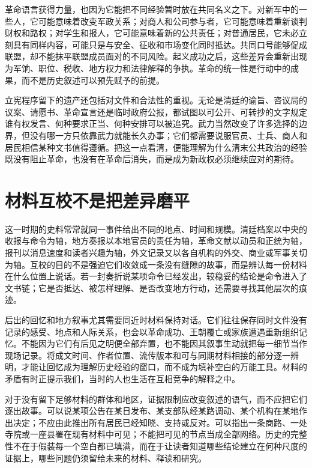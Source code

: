 革命语言获得力量，也因为它能把不同经验暂时放在共同名义之下。对新军中的一些人，它可能意味着改变军政关系；对商人和公司参与者，它可能意味着重新谈判财权和路权；对学生和报人，它可能意味着新的公共责任；对普通居民，它未必立刻具有同样内容，可能只是与安全、征收和市场变化同时抵达。共同口号能够促成联盟，却不能抹平联盟成员面对的不同风险。起义成功之后，这些差异会重新出现为军饷、职位、税收、地方权力和法律解释的争执。革命的统一性是行动中的成果，而不是历史叙述可以预先赋予的前提。

立宪程序留下的遗产还包括对文件和合法性的重视。无论是清廷的谕旨、咨议局的议案、请愿书、革命宣言还是临时政府公报，都试图以可公开、可转抄的文字规定谁有权发言、何种要求正当、何种安排可以被追究。武力当然改变了许多选择的边界，但没有哪一方只依靠武力就能长久办事；它们都需要说服官员、士兵、商人和居民相信某种文书值得遵循。把这一点看清，便能理解为什么清末公共政治的经验既没有阻止革命，也没有在革命后消失，而是成为新政权必须继续应对的期待。

\section{材料互校不是把差异磨平}

这一时期的史料常常就同一事件给出不同的地点、时间和规模。清廷档案以中央的收报与命令为轴，地方奏报以本地官员的责任为轴，革命文献以动员和正统为轴，报刊以消息速度和读者兴趣为轴，外文记录又以各自机构的外交、商业或军事关切为轴。互校的目的不是强迫它们收敛成一条没有缝隙的故事，而是辨认每一份材料在什么位置上说话。若一封奏折说某项命令已经发出，较稳妥的结论是命令进入了文书链；它是否抵达、被怎样理解、是否改变地方行动，还需要寻找其他层次的痕迹。

后出的回忆和地方叙事尤其需要同近时材料保持对话。它们往往保存同时文件没有记录的感受、地点和人际关系，也会以革命成功、王朝覆亡或家族遭遇重新组织记忆。不能因为它们有后见之明便全部弃置，也不能因其叙事生动就把每一细节当作现场记录。将成文时间、作者位置、流传版本和可与同期材料相接的部分逐一辨明，才能让回忆成为理解历史经验的窗口，而不成为填补空白的万能工具。材料的矛盾有时正提示我们，当时的人也生活在互相竞争的解释之中。

对于没有留下足够材料的群体和地区，证据限制应改变叙述的语气，而不应把它们逐出故事。可以说某项公告在某日发布、某支部队经某路调动、某个机构在某地作出决定；不应由此推出所有居民已经知晓、支持或反对。可以指出一条商路、一处寺院或一座县署在现有材料中可见；不能把可见的节点当成全部网络。历史的完整性不在于假装每一个空白都已填满，而在于让读者知道哪些结论建立在何种尺度的证据上，哪些问题仍须留给未来的材料、释读和研究。

